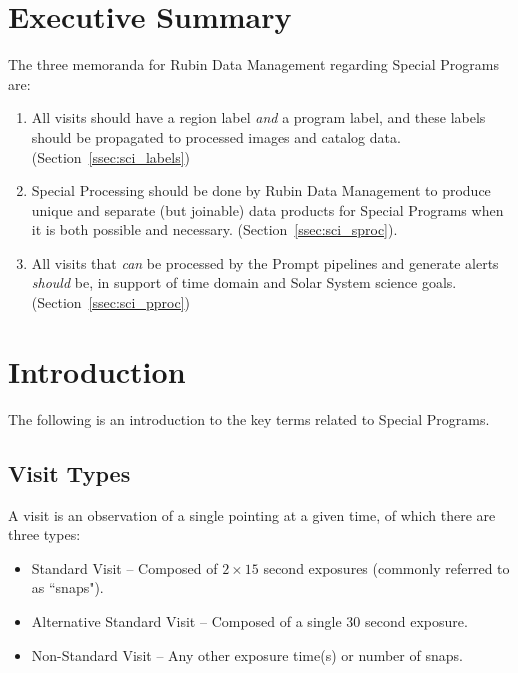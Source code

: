 \section{Executive Summary} \label{sec:execsum}

The three memoranda for Rubin Data Management regarding Special Programs are:

\begin{enumerate}

\item All visits should have a region label \textit{and} a program 
label, and these labels should be propagated to processed images and catalog data.
(Section~\ref{ssec:sci_labels})

\item Special Processing should be done by Rubin Data Management to 
produce unique and separate (but joinable) data products
for Special Programs when it is both possible and necessary.
(Section~\ref{ssec:sci_sproc}).

\item All visits that \emph{can} be processed by the Prompt pipelines and generate 
alerts \emph{should} be, in support of time domain and Solar System science goals.
(Section~\ref{ssec:sci_pproc})

\end{enumerate}

\section{Introduction}\label{sec:intro}

The following is an introduction to the key terms related to Special Programs.

\subsection{Visit Types}

A visit is an observation of a single pointing at a given time, of which 
there are three types:

\begin{itemize}
\item Standard Visit -- Composed of $2\times15$ second exposures (commonly referred to as ``snaps").
\item Alternative Standard Visit -- Composed of a single $30$ second exposure.
\item Non-Standard Visit -- Any other exposure time(s) or number of snaps.
\end{itemize}

